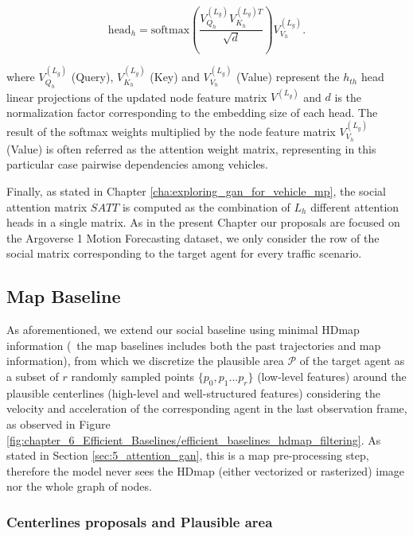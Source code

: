 \begin{equation}
	\mathrm{head}_h = \mathrm{softmax} \left( \frac{V^{(L_g)}_{Q_h} V^{(L_g) T}_{K_h}}{\sqrt{d}}  \right) V^{(L_g)}_{V_h} \text{.}
\end{equation}

where $V^{(L_g)}_{Q_h}$ (Query), $V^{(L_g)}_{K_h}$ (Key) and $V^{(L_g)}_{V_h}$ (Value) represent the \textit{$h_{th}$} head linear projections of the updated node feature matrix $V^{(L_g)}$ and $d$ is the normalization factor corresponding to the embedding size of each head. The result of the softmax weights multiplied by the node feature matrix $V^{(L_g)}_{V_h}$ (Value) is often referred as the attention weight matrix, representing in this particular case pairwise dependencies among vehicles.

Finally, as stated in Chapter \ref{cha:exploring_gan_for_vehicle_mp}, the social attention matrix $SATT$ is computed as the combination of $L_h$ different attention heads in a single matrix. As in the present Chapter our proposals are focused on the Argoverse 1 Motion Forecasting dataset, we only consider the row of the social matrix corresponding to the target agent for every traffic scenario.

\subsection{Map Baseline} 
\label{subsec:6_efficient_baselines_map_baseline}

As aforementioned, we extend our social baseline using minimal \ac{HDmap} information (\ie \ the map baselines includes both the past trajectories and map information), from which we discretize the plausible area $\mathcal{P}$ of the target agent as a subset of $r$ randomly sampled points $\{p_0 , p_1 ... p_r\}$ (low-level features) around the plausible centerlines (high-level and well-structured features) considering the velocity and acceleration of the corresponding agent in the last observation frame, as observed in Figure \ref{fig:chapter_6_Efficient_Baselines/efficient_baselines_hdmap_filtering}. As stated in Section \ref{sec:5_attention_gan}, this is a map pre-processing step, therefore the model never sees the \ac{HDmap} (either vectorized or rasterized) image nor the whole graph of nodes.

\subsubsection{Centerlines proposals and Plausible area} 
\label{subsubsec:6_efficient_baselines_preprocessing_map}

